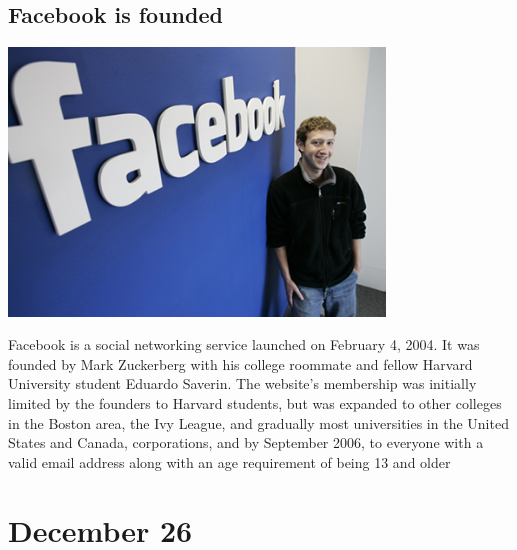 \documentclass[11pt]{report}
\begin{document}
\subsection{Facebook is founded}
\vspace{2mm}\begin{center}\includegraphics[width=10cm]{./img/facebook.jpg}\end{center}
Facebook is a social networking service launched on February 4, 2004. It was founded by Mark Zuckerberg with his college roommate and fellow Harvard University student Eduardo Saverin. The website's membership was initially limited by the founders to Harvard students, but was expanded to other colleges in the Boston area, the Ivy League, and gradually most universities in the United States and Canada, corporations, and by September 2006, to everyone with a valid email address along with an age requirement of being 13 and older

\section{December 26}
\end{document}
